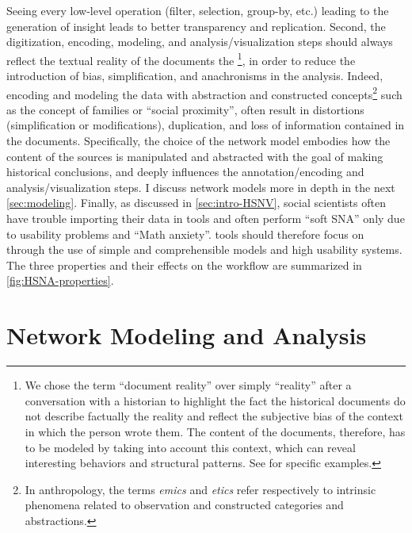 Seeing every low-level operation (filter, selection, group-by, etc.) leading to the generation of insight leads to better transparency and replication\cite{callahanVisTrailsVisualizationMeets2006, xuSurveyAnalysisUser2020}.
Second, the digitization, encoding, modeling, and analysis/visualization steps should always reflect the textual reality of the documents \ie the \reality\footnote{We chose the term ``document reality'' over simply ``reality'' after a conversation with a historian to highlight the fact the historical documents do not describe factually the reality and reflect the subjective bias of the context in which the person wrote them\cite{karila-cohenNouvellesCuisinesHistoire2018}. The content of the documents, therefore, has to be modeled by taking into account this context, which can reveal interesting behaviors and structural patterns. See \cite{lemercierBackSourcesPracticing2021} for specific examples.}, in order to reduce the introduction of bias, simplification, and anachronisms in the analysis\cite{karila-cohenNouvellesCuisinesHistoire2018, lemercierQuantitativeMethodsHumanities2019}.
Indeed, encoding and modeling the data with abstraction and constructed concepts\footnote{In anthropology, the terms \emph{emics} and \emph{etics} refer respectively to intrinsic phenomena related to observation and constructed categories and abstractions\cite{headlandEmicsEticsInsider1990}.} such as the concept of families or ``social proximity'', often result in distortions (simplification or modifications), duplication, and loss of information contained in the documents.
Specifically, the choice of the network model embodies how the content of the sources is manipulated and abstracted with the goal of making historical conclusions, and deeply influences the annotation/encoding and analysis/visualization steps.
I discuss network models more in depth in the next \autoref{sec:modeling}.
Finally, as discussed in \autoref{sec:intro-HSNV}, social scientists often have trouble importing their data in \sna tools\cite{alkadi2022} and often perform ``soft SNA''\cite{rollingerProlegomenaProblemsPerspectives2020} only due to usability problems and ``Math anxiety''\cite{paxtonDollarsSenseConvincing2006}.
\va tools should therefore focus on \simplicity through the use of simple and comprehensible models and high usability systems.
The three properties and their effects on the workflow are summarized in \autoref{fig:HSNA-properties}.





\section{Network Modeling and Analysis}\label{sec:modeling}

